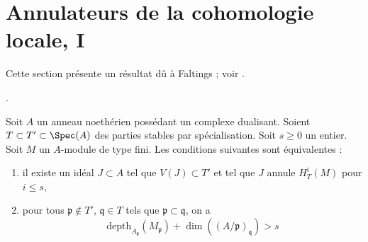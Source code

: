 \section{Annulateurs de la cohomologie locale, I}
\label{section-annihilators}

\noindent
Cette section présente un résultat dû à Faltings ; voir \cite{Faltings-annulators}.

\begin{proposition}
\label{proposition-annihilator}
\begin{reference}
\cite{Faltings-annulators}.
\end{reference}
Soit $A$ un anneau noethérien possédant un complexe dualisant. Soient $T \subset T' \subset \Spec(A)$ des parties stables par spécialisation. Soit $s \geq 0$ un entier. Soit $M$ un $A$-module de type fini. Les conditions suivantes sont équivalentes :
\begin{enumerate}
\item il existe un idéal $J \subset A$ tel que $V(J) \subset T'$ et tel que $J$ annule $H^i_T(M)$ pour $i \leq s$,
\item pour tous $\mathfrak p \not \in T'$, $\mathfrak q \in T$ tels que $\mathfrak p \subset \mathfrak q$, on a
$$
\text{depth}_{A_\mathfrak p}(M_\mathfrak p) +
\dim((A/\mathfrak p)_\mathfrak q) > s
$$
\end{enumerate}
\end{proposition}


